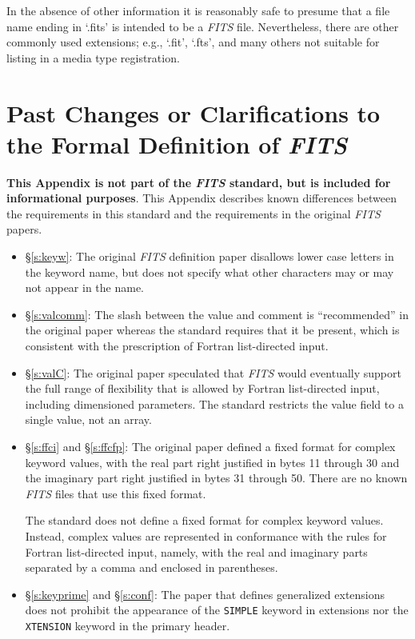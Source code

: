 \documentclass[11pt,makeidx]{book}     %
\begin{document}
  In the absence of other information it is reasonably safe to presume
  that a file name ending in `.fits' is intended to be a {\em FITS\/} file.
  Nevertheless, there are other commonly used extensions; e.g., `.fit',
  `.fts', and many others not suitable for listing in a media type
  registration.


 


\chapter{Past Changes or Clarifications to the Formal Definition of {\em FITS\/}}
\label{s:changes}   
{\bf This Appendix is not part of the {\em FITS\/} standard, 
but  is included for
informational purposes}.  This Appendix describes known differences between 
the requirements in this standard 
and the requirements in the original {\em FITS\/} papers.


\begin{itemize}

\item \S\ref{s:keyw}:
The original {\em FITS\/} definition paper \cite{wells81} disallows lower case letters in the keyword name, but does 
not specify what other characters may or may not appear in the name.
 
\item \S\ref{s:valcomm}:
The slash between the value and comment is ``recommended'' in the original paper \cite{wells81} whereas 
the standard requires that it be present, which is consistent with the prescription of Fortran list-directed input.
 
\item \S\ref{s:valC}:
The original paper \cite{wells81} speculated that {\em FITS\/} would eventually support the full
range of flexibility that is allowed by Fortran list-directed input, including dimensioned parameters.
The standard restricts the value field to a single value, not an array.


\item \S\ref{s:ffci} and \S\ref{s:ffcfp}:
The original paper \cite{wells81} defined a fixed format for complex keyword values, 
with the real part right justified in bytes 11 through 30 and the
imaginary part right justified in bytes 31 through 50.  There are no known {\em FITS\/} files
that use this fixed format.  

The standard does not define a fixed format for complex keyword 
values.  Instead, complex values are represented in conformance with the rules for
Fortran list-directed input, namely, with the real and imaginary parts separated by a comma and 
enclosed in parentheses.

\item \S\ref{s:keyprime} and \S\ref{s:conf}:
The paper that defines generalized extensions \cite{grosbol88} does not prohibit
the appearance of the {\tt SIMPLE} keyword in extensions nor the {\tt XTENSION}
keyword in the primary header.

\end{itemize}
\end{document}
